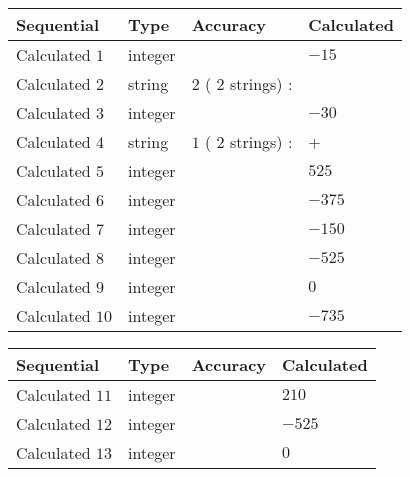 \documentclass[12pt]{article}
\begin{document}
  
\noindent\begin{tabular}{|l|l|l|l|}
\hline
 Sequential & Type & Accuracy & Calculated \\ 
\hline
 
 
  Calculated $           1$ & integer &  & 
  $ -15 $ 
 \\  \hline  
 
 
  Calculated $           2$ & string & $           2 $ ( $          2 $ strings)
 : 
 & 
 \\  \hline  
 
 
  Calculated $           3$ & integer &  & 
  $ -30 $ 
 \\  \hline  
 
 
  Calculated $           4$ & string & $           1 $ ( $          2 $ strings)
 : 
 & +
 \\  \hline  
 
 
  Calculated $           5$ & integer &  & 
  $ 525 $ 
 \\  \hline  
 
 
  Calculated $           6$ & integer &  & 
  $ -375 $ 
 \\  \hline  
 
 
  Calculated $           7$ & integer &  & 
  $ -150 $ 
 \\  \hline  
 
 
  Calculated $           8$ & integer &  & 
  $ -525 $ 
 \\  \hline  
 
 
  Calculated $           9$ & integer &  & 
  $ 0 $ 
 \\  \hline  
 
 
  Calculated $          10$ & integer &  & 
  $ -735 $ 
 \\  \hline  
 \end{tabular}
   
   
  
  
\noindent\begin{tabular}{|l|l|l|l|}
\hline
 Sequential & Type & Accuracy & Calculated \\ 
\hline
 
 
  Calculated $          11$ & integer &  & 
  $ 210 $ 
 \\  \hline  
 
 
  Calculated $          12$ & integer &  & 
  $ -525 $ 
 \\  \hline  
 
 
  Calculated $          13$ & integer &  & 
  $ 0 $ 
 \\  \hline  
 \end{tabular}
   
\end{document}
